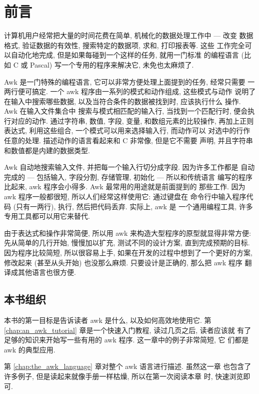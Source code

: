 \chapter{前言}
\label{chap:preface}

计算机用户经常把大量的时间花费在简单, 机械化的数据处理工作中 --- 改变
数据格式, 验证数据的有效性, 搜索特定的数据项, 求和, 打印报表等. 这些
工作完全可以自动化地完成, 但是如果每碰到一个这样的任务, 就用一门标准
的编程语言 (比如 C 或 Pascal) 写一个专用的程序来解决它, 未免也太麻烦了.

Awk 是一门特殊的编程语言, 它可以非常方便处理上面提到的任务, 经常只需要
一两行便可搞定. 一个 awk 程序由一系列的模式和动作组成, 这些模式与动作
说明了在输入中搜索哪些数据, 以及当符合条件的数据被找到时, 应该执行什么
操作. Awk 在输入文件集合中 搜索与模式相匹配的输入行, 当找到一个匹配行时, 
便会执行对应的动作. 通过字符串, 数值, 字段, 变量, 和数组元素的比较操作,
再加上正则表达式, 利用这些组合, 一个模式可以用来选择输入行, 而动作可以
对选中的行作任意的处理. 描述动作的语言看起来和 C 非常像, 但是它不需要
声明, 并且字符串和数值都是内建的数据类型.

Awk 自动地搜索输入文件, 并把每一个输入行切分成字段. 因为许多工作都是
自动完成的 --- 包括输入, 字段分割, 存储管理, 初始化 --- 所以和传统语言
编写的程序比起来, awk 程序会小得多. Awk 最常用的用途就是前面提到的
那些工作. 因为 awk 程序一般都很短, 所以人们经常这样使用它: 通过键盘在
命令行中输入程序代码 (只有一两行), 执行, 然后把代码丢弃. 实际上, awk 是
一个通用编程工具, 许多专用工具都可以用它来替代.

由于表达式和操作非常简便, 所以用 awk 来构造大型程序的原型就显得非常方便:
先从简单的几行开始, 慢慢加以扩充, 测试不同的设计方案, 直到完成预期的目标.
因为程序比较简短, 所以很容易上手, 如果在开发的过程中想到了一个更好的方案,
修改起来 (甚至从头开始) 也没那么麻烦. 只要设计是正确的, 那么把 awk 程序
翻译成其他语言也很方便.

\section*{本书组织}
本书的第一目标是告诉读者 awk 是什么, 以及如何高效地使用它. 第 
\ref{chap:an_awk_tutorial} 章是一个快速入门教程, 读过几页之后, 读者应该就
有了足够的知识来开始写一些有用的 awk 程序. 这一章中的例子非常简短, 它
们都是 awk 的典型应用.

第 \ref{chap:the_awk_language} 章对整个 awk 语言进行描述. 虽然这一章
也包含了许多例子, 但是读起来就像手册一样枯燥, 所以在第一次阅读本章
时, 快速浏览即可.

